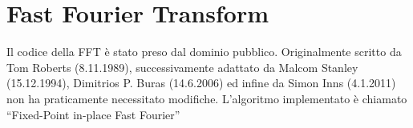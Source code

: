 
\section{Fast Fourier Transform}
Il codice della FFT \`e stato preso dal dominio pubblico. Originalmente
scritto da Tom Roberts (8.11.1989), successivamente adattato da Malcom Stanley
(15.12.1994), Dimitrios P. Buras (14.6.2006) ed infine da Simon Inns
(4.1.2011) \cite{waitingforfriday} non ha praticamente necessitato modifiche.
L'algoritmo implementato \`e chiamato ``Fixed-Point in-place Fast Fourier''


